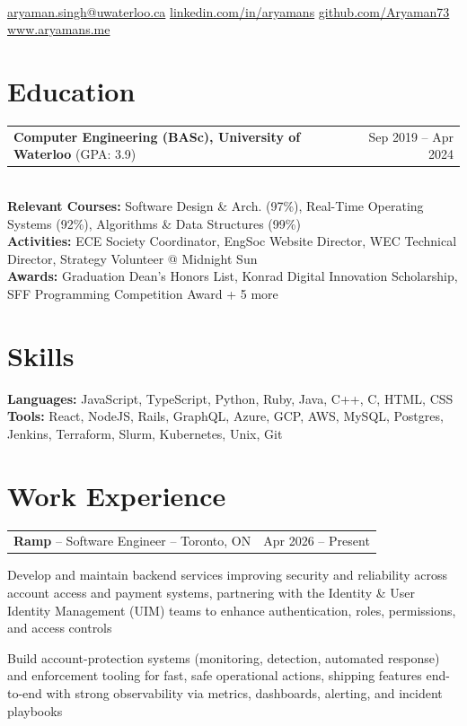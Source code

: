 \documentclass[letterpaper,10pt]{article}
\makeatletter
\newcommand{\entry}[2]{%
  \noindent\begin{tabularx}{\linewidth}{@{}X r@{}}
    #1 & #2 \\
  \end{tabularx}%
}
\makeatother
\begin{document}
\begin{center}
  {\Huge\bfseries \textcolor{accent}{} }\\[4pt]
  \small
  \href{mailto:aryaman.singh@uwaterloo.ca}{aryaman.singh@uwaterloo.ca} \quad\textbar\quad
  \href{https://linkedin.com/in/aryamans}{linkedin.com/in/aryamans} \quad\textbar\quad
  \href{https://github.com/Aryaman73}{github.com/Aryaman73} \quad\textbar\quad
  \href{https://www.aryamans.me}{www.aryamans.me}
\end{center}

\section{Education}
\entry{\textbf{Computer Engineering (BASc), University of Waterloo} (GPA: 3.9)}{Sep 2019 -- Apr 2024}\\[2pt]
\textbf{Relevant Courses:} Software Design \& Arch. (97\%), Real-Time Operating Systems (92\%), Algorithms \& Data Structures (99\%)\\
\textbf{Activities:} ECE Society Coordinator, EngSoc Website Director, WEC Technical Director, Strategy Volunteer @ Midnight Sun\\
\textbf{Awards:} Graduation Dean's Honors List, Konrad Digital Innovation Scholarship, SFF Programming Competition Award + 5 more

\section{Skills}
\textbf{Languages:} JavaScript, TypeScript, Python, Ruby, Java, C++, C, HTML, CSS\\
\textbf{Tools:} React, NodeJS, Rails, GraphQL, Azure, GCP, AWS, MySQL, Postgres, Jenkins, Terraform, Slurm, Kubernetes, Unix, Git

\section{Work Experience}

\entry{\textbf{Ramp} -- Software Engineer -- Toronto, ON}{Apr 2026 -- Present}
\begin{tight}
  \item Develop and maintain backend services improving security and reliability across account access and payment systems, partnering with the Identity \& User Identity Management (UIM) teams to enhance authentication, roles, permissions, and access controls
  \item Build account-protection systems (monitoring, detection, automated response) and enforcement tooling for fast, safe operational actions, shipping features end-to-end with strong observability via metrics, dashboards, alerting, and incident playbooks
\end{tight}
\end{document}
